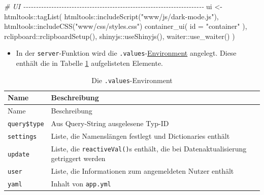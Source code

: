 \documentclass[
]{article}
\newenvironment{Shaded}{\begin{snugshade}}{\end{snugshade}}
\newcommand{\AttributeTok}[1]{\textcolor[rgb]{0.77,0.63,0.00}{#1}}
\newcommand{\CommentTok}[1]{\textcolor[rgb]{0.56,0.35,0.01}{\textit{#1}}}
\newcommand{\FunctionTok}[1]{\textcolor[rgb]{0.00,0.00,0.00}{#1}}
\newcommand{\NormalTok}[1]{#1}
\newcommand{\OtherTok}[1]{\textcolor[rgb]{0.56,0.35,0.01}{#1}}
\newcommand{\SpecialCharTok}[1]{\textcolor[rgb]{0.00,0.00,0.00}{#1}}
\newcommand{\StringTok}[1]{\textcolor[rgb]{0.31,0.60,0.02}{#1}}
\providecommand{\tightlist}{%
  \setlength{\itemsep}{0pt}\setlength{\parskip}{0pt}}
\begin{document}
\begin{Shaded}
\begin{Highlighting}[]
    \CommentTok{\# UI {-}{-}{-}{-}{-}{-}{-}{-}{-}{-}{-}{-}{-}{-}{-}{-}{-}{-}{-}{-}{-}{-}{-}{-}{-}{-}{-}{-}{-}{-}{-}{-}{-}{-}{-}{-}{-}{-}{-}{-}{-}{-}{-}{-}{-}{-}{-}{-}{-}{-}{-}{-}{-}{-}{-}{-}{-}{-}{-}{-}{-}{-}{-}{-}{-}{-}{-}{-}{-}{-}{-}}
\NormalTok{    ui }\OtherTok{\textless{}{-}}\NormalTok{ htmltools}\SpecialCharTok{::}\FunctionTok{tagList}\NormalTok{(}
\NormalTok{        htmltools}\SpecialCharTok{::}\FunctionTok{includeScript}\NormalTok{(}\StringTok{"www/js/dark{-}mode.js"}\NormalTok{),}
\NormalTok{        htmltools}\SpecialCharTok{::}\FunctionTok{includeCSS}\NormalTok{(}\StringTok{"www/css/styles.css"}\NormalTok{)}
        \FunctionTok{container\_ui}\NormalTok{(}
            \AttributeTok{id =} \StringTok{"container"}
\NormalTok{        ),}
\NormalTok{        rclipboard}\SpecialCharTok{::}\FunctionTok{rclipboardSetup}\NormalTok{(),}
\NormalTok{        shinyjs}\SpecialCharTok{::}\FunctionTok{useShinyjs}\NormalTok{(),}
\NormalTok{        waiter}\SpecialCharTok{::}\FunctionTok{use\_waiter}\NormalTok{()}
\NormalTok{    )}
\end{Highlighting}
\end{Shaded}

\begin{itemize}
\tightlist
\item
  In der \texttt{server}-Funktion wird die \texttt{.values}-\href{https://adv-r.hadley.nz/environments.html}{Environment} angelegt. Diese enthält die in Tabelle \ref{tab:values-environment} aufgelisteten Elemente.
\end{itemize}

\begin{longtable}[]{@{}
  >{\raggedright\arraybackslash}p{}
  >{\raggedright\arraybackslash}p{}@{}}
\caption{\label{tab:values-environment} Die \texttt{.values}-Environment}\tabularnewline
\toprule
Name & Beschreibung \\
\midrule
\endfirsthead
\toprule
Name & Beschreibung \\
\midrule
\endhead
\texttt{query\$type} & Aus Query-String ausgelesene Typ-ID \\
\texttt{settings} & Liste, die Namenslängen festlegt und Dictionaries enthält \\
\texttt{update} & Liste, die \texttt{reactiveVal()}s enthält, die bei Datenaktualisierung getriggert werden \\
\texttt{user} & Liste, die Informationen zum angemeldeten Nutzer enthält \\
\texttt{yaml} & Inhalt von \texttt{app.yml} \\
\bottomrule
\end{longtable}
\end{document}
